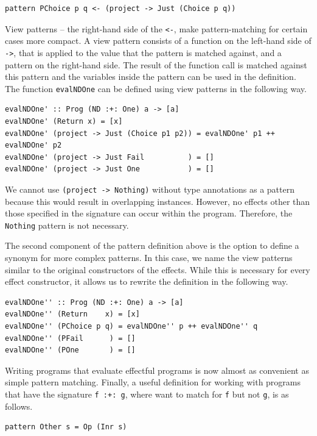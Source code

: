 \documentclass[a4paper, 11pt, fleqn, twoside]{scrreprt}
\newcommand{\hinl}[1]{\texttt{#1}}
\begin{document}
\begin{verbatim}
pattern PChoice p q <- (project -> Just (Choice p q))
\end{verbatim}

View patterns -- the right-hand side of the \hinl{<-}, make pattern-matching for certain cases more compact.
A view pattern consists of a function on the left-hand side of \hinl{->}, that is applied to the value that the pattern is matched against, and a pattern on the right-hand side.
The result of the function call is matched against this pattern and the variables inside the pattern can be used in the definition.
The function \hinl{evalNDOne} can be defined using view patterns in the following way.

\begin{verbatim}
evalNDOne' :: Prog (ND :+: One) a -> [a]
evalNDOne' (Return x) = [x]
evalNDOne' (project -> Just (Choice p1 p2)) = evalNDOne' p1 ++ evalNDOne' p2
evalNDOne' (project -> Just Fail          ) = []
evalNDOne' (project -> Just One           ) = []
\end{verbatim}

We cannot use \hinl{(project -> Nothing)} without type annotations as a pattern because this would result in overlapping instances.
However, no effects other than those specified in the signature can occur within the program.
Therefore, the \hinl{Nothing} pattern is not necessary.

The second component of the pattern definition above is the option to define a synonym for more complex patterns.
In this case, we name the view patterns similar to the original constructors of the effects.
While this is necessary for every effect constructor, it allows us to rewrite the definition in the following way.

\begin{verbatim}
evalNDOne'' :: Prog (ND :+: One) a -> [a]
evalNDOne'' (Return    x) = [x]
evalNDOne'' (PChoice p q) = evalNDOne'' p ++ evalNDOne'' q
evalNDOne'' (PFail      ) = []
evalNDOne'' (POne       ) = []
\end{verbatim}

Writing programs that evaluate effectful programs is now almost as convenient as simple pattern matching.
Finally, a useful definition for working with programs that have the signature \hinl{f :+: g}, where want to match for \hinl{f} but not \hinl{g}, is as follows.

\begin{verbatim}
pattern Other s = Op (Inr s)
\end{verbatim}
\end{document}
